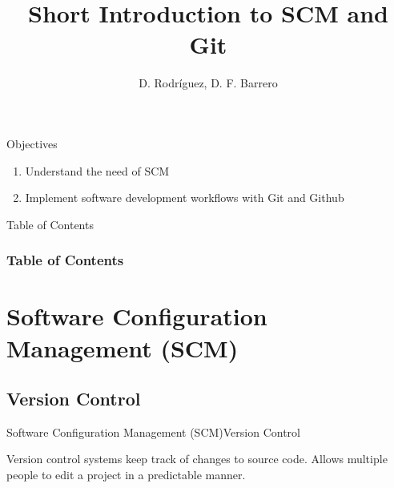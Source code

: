 \documentclass[10pt,compress]{beamer} %
\title[Git]{Short Introduction to SCM and Git}
\author{D. Rodríguez, D. F. Barrero}
\institute{University of Alcalá}
\date{}
\begin{document}
{\titlepageBlue
    \begin{frame}
        \titlepage
    \end{frame}
}

\begin{frame}[plain]{}
   \begin{block}{Objectives}
      \begin{enumerate}
         \item Understand the need of SCM
         \item Implement software development workflows with Git and Github
      \end{enumerate} 
   \end{block}



\end{frame}

{
\eliminarNavegacion
\begin{frame}[shrink]{Table of Contents}
 \frametitle{Table of Contents}
 \tableofcontents
\end{frame}
}

\section{Software Configuration Management (SCM)}


\subsection{Version Control}



\begin{frame}{Software Configuration Management (SCM)}{Version Control}

Version control systems keep track of changes to source code.
Allows multiple people to edit a project in a predictable manner.

\end{frame}
\end{document}
